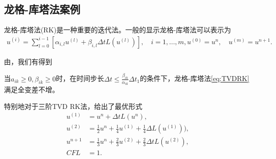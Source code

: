 \subsection{龙格-库塔法案例}
龙格-库塔法(RK)是一种重要的迭代法。一般的显示龙格-库塔法可以表示为
\begin{equation}
    \begin{aligned}
        u^{(i)} = \sum_{l=0}^{i-1}[\alpha_{i,l}u^{(l)} + \beta_{i,l}\Delta tL(u^{(l)})], \quad i = 1,...,m,
        u^{(0)}=u^n,\quad u^{(m)} = u^{n+1}.
    \end{aligned}
    \label{eq:TVDRK}
\end{equation}

由\parencite{shu1998total}，我们有得到
\begin{lemma}
    当$a_{ik} \geq 0, \beta_{ik} \geq 0$时，在时间步长$\Delta t \leq \frac{\beta_{ik}}{\alpha_{ik}} \Delta t_1$的条件下，龙格-库塔法\eqref{eq:TVDRK}满足全变差不增。
\end{lemma}

特别地对于三阶TVD RK法，\parencite{shu1998total}给出了最优形式
\begin{equation}
    \begin{aligned}
        u^{(1)} & = u^n + \Delta t L(u^n),                                                \\
        u^{(2)} & = \frac{1}{2}u^n + \frac{1}{4}u^{(1)} + \frac{1}{4}\Delta L(u^{(1)})),  \\
        u^{n+1} & = \frac{1}{3}u^n + \frac{2}{3}u^{(2)} + \frac{2}{3}\Delta t L(u^{(2)}), \\
        CFL     & = 1.
    \end{aligned}
\end{equation}

